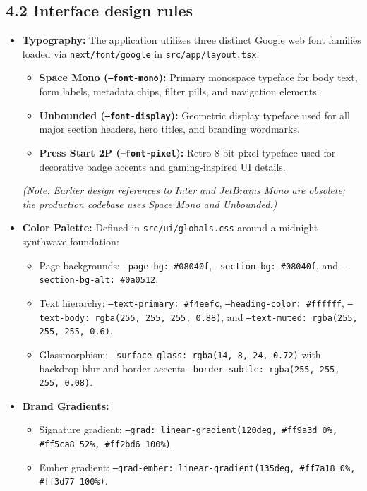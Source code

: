 \documentclass[11pt,letterpaper]{article}
\begin{document}
\subsection*{4.2 Interface design rules}
\begin{itemize}[leftmargin=*,itemsep=3pt]
\item \textbf{Typography:} The application utilizes three distinct Google web font families loaded via \texttt{next/font/google} in \texttt{src/app/layout.tsx}:
  \begin{itemize}[noitemsep]
  \item \textbf{Space Mono (\texttt{--font-mono}):} Primary monospace typeface for body text, form labels, metadata chips, filter pills, and navigation elements.
  \item \textbf{Unbounded (\texttt{--font-display}):} Geometric display typeface used for all major section headers, hero titles, and branding wordmarks.
  \item \textbf{Press Start 2P (\texttt{--font-pixel}):} Retro 8-bit pixel typeface used for decorative badge accents and gaming-inspired UI details.
  \end{itemize}
  \textit{(Note: Earlier design references to Inter and JetBrains Mono are obsolete; the production codebase uses Space Mono and Unbounded.)}
\item \textbf{Color Palette:} Defined in \texttt{src/ui/globals.css} around a midnight synthwave foundation:
  \begin{itemize}[noitemsep]
  \item Page backgrounds: \texttt{--page-bg: \#08040f}, \texttt{--section-bg: \#08040f}, and \texttt{--section-bg-alt: \#0a0512}.
  \item Text hierarchy: \texttt{--text-primary: \#f4eefc}, \texttt{--heading-color: \#ffffff}, \texttt{--text-body: rgba(255, 255, 255, 0.88)}, and \texttt{--text-muted: rgba(255, 255, 255, 0.6)}.
  \item Glassmorphism: \texttt{--surface-glass: rgba(14, 8, 24, 0.72)} with backdrop blur and border accents \texttt{--border-subtle: rgba(255, 255, 255, 0.08)}.
  \end{itemize}
\item \textbf{Brand Gradients:}
  \begin{itemize}[noitemsep]
  \item Signature gradient: \texttt{--grad: linear-gradient(120deg, \#ff9a3d 0\%, \#ff5ca8 52\%, \#ff2bd6 100\%)}.
  \item Ember gradient: \texttt{--grad-ember: linear-gradient(135deg, \#ff7a18 0\%, \#ff3d77 100\%)}.

\end{itemize}
\end{itemize}
\end{document}
